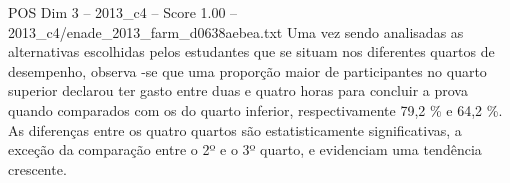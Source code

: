 \begin{textsample}{POS Dim 3 – 2013\_c4 – Score 1.00 – 2013\_c4/enade\_2013\_farm\_d0638aebea.txt}
Uma vez sendo analisadas as alternativas escolhidas pelos estudantes que se situam nos diferentes quartos de desempenho, observa -se que uma proporção maior de participantes no quarto superior declarou ter gasto entre duas e quatro horas para concluir a prova quando comparados com os do quarto inferior, respectivamente 79,2 \% e 64,2 \%.
As diferenças entre os quatro quartos são estatisticamente significativas, a exceção da comparação entre o 2º e o 3º quarto, e evidenciam uma tendência crescente.

\end{textsample}
